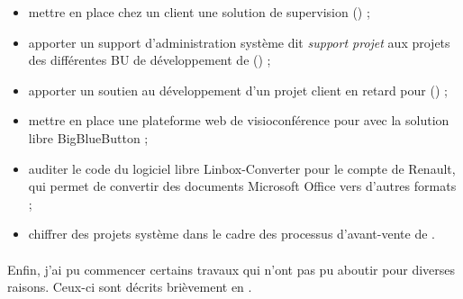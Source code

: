\begin{itemize}
	\item mettre en place chez un client une solution de supervision \acentreon{} () ;
	\item apporter un support d'administration système dit \emph{support projet} aux projets des différentes BU de développement de \asmile{} () ;
	\item apporter un soutien au développement d'un projet client en retard pour \abt{} () ;
	\item mettre en place une plateforme web de visioconférence pour \asmile{} avec la solution libre BigBlueButton ;
	\item auditer le code du logiciel libre Linbox-Converter pour le compte de Renault, qui permet de convertir des documents Microsoft Office vers d'autres formats ;
	\item chiffrer des projets système dans le cadre des processus d'avant-vente de \asmile.
\end{itemize}

\paragraph{}
Enfin, j'ai pu commencer certains travaux qui n'ont pas pu aboutir pour diverses raisons.
Ceux-ci sont décrits brièvement en .

